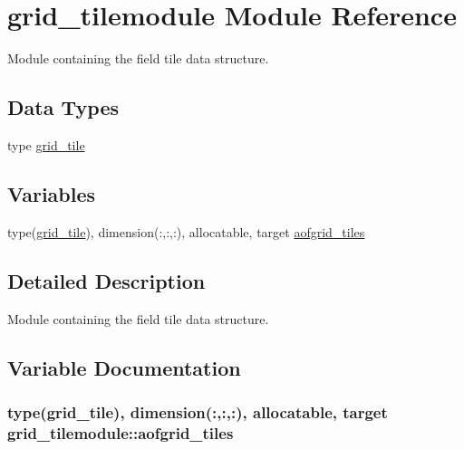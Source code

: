 \hypertarget{namespacegrid__tilemodule}{}\section{grid\+\_\+tilemodule Module Reference}
\label{namespacegrid__tilemodule}


Module containing the field tile data structure.  


\subsection*{Data Types}
\begin{DoxyCompactItemize}
\item 
type \hyperlink{structgrid__tilemodule_1_1grid__tile}{grid\+\_\+tile}
\end{DoxyCompactItemize}
\subsection*{Variables}
\begin{DoxyCompactItemize}
\item 
type(\hyperlink{structgrid__tilemodule_1_1grid__tile}{grid\+\_\+tile}), dimension(\+:,\+:,\+:), allocatable, target \hyperlink{namespacegrid__tilemodule_aaf5f66ae67467ddc14c20d57a5fed954}{aofgrid\+\_\+tiles}
\end{DoxyCompactItemize}


\subsection{Detailed Description}
Module containing the field tile data structure. 

\subsection{Variable Documentation}
\subsubsection[{\texorpdfstring{aofgrid\+\_\+tiles}{aofgrid_tiles}}]{\setlength{\rightskip}{0pt plus 5cm}type({\bf grid\+\_\+tile}), dimension(\+:,\+:,\+:), allocatable, target grid\+\_\+tilemodule\+::aofgrid\+\_\+tiles}\hypertarget{namespacegrid__tilemodule_aaf5f66ae67467ddc14c20d57a5fed954}{}\label{namespacegrid__tilemodule_aaf5f66ae67467ddc14c20d57a5fed954}
